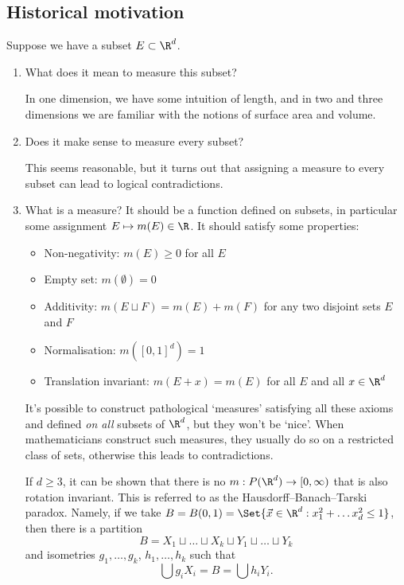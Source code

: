 \documentclass{article}
\newcommand{\1}[1]{\mathbbm{1}_{#1}}
\begin{document}
\subsection{Historical motivation}
Suppose we have a subset $E \subset \R^d$.
\begin{enumerate}
    \item What does it mean to measure this subset?

        In one dimension, we have some intuition of length, and in two and three dimensions we are familiar with the notions of surface area and volume.
    \item Does it make sense to measure every subset?

        This seems reasonable, but it turns out that assigning a measure to every subset can lead to logical contradictions.
    \item What is a measure? It should be a function defined on subsets, in particular some assignment $E \mapsto m(E) \in \R$.
        It should satisfy some properties:
        \begin{itemize}
            \item Non-negativity: $m(E) \geq 0$ for all $E$
            \item Empty set: $m(\emptyset) = 0$
            \item Additivity: $m(E \sqcup F) = m(E) + m(F)$ for any two disjoint sets $E$ and $F$
            \item Normalisation: $m([0, 1]^d) = 1$
            \item Translation invariant: $m(E + x) = m(E)$ for all $E$ and all $x \in \R^d$
        \end{itemize}
        It's possible to construct pathological `measures' satisfying all these axioms and defined \emph{on all} subsets of $\R^d$, but they won't be `nice'.
        When mathematicians construct such measures, they usually do so on a restricted class of sets, otherwise this leads to contradictions.

        If $d \geq 3$, it can be shown that there is no $m: P(\R^d) \to [0, \infty)$ that is also rotation invariant.
        This is referred to as the Hausdorff--Banach--Tarski paradox.
        Namely, if we take $B = B(0, 1) = \Set{\vec{x} \in \R^d: x_1^2 + \dots x_d^2 \leq 1}$, then there is a partition
        \begin{equation*}
            B = X_1 \sqcup \dots \sqcup X_k \sqcup Y_1 \sqcup \dots \sqcup Y_k
        \end{equation*}
        and isometries $g_1, \dotsc, g_k$, $h_1, \dotsc, h_k$ such that
        \begin{equation*}
            \bigcup g_i X_i = B = \bigcup h_i Y_i.
        \end{equation*}
\end{enumerate}
\end{document}
